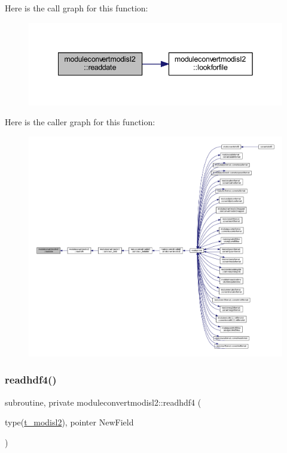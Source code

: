 Here is the call graph for this function\+:\nopagebreak
\begin{figure}[H]
\begin{center}
\leavevmode
\includegraphics[width=342pt]{namespacemoduleconvertmodisl2_a0d7d930d189037284103c8340c2d3cf6_cgraph}
\end{center}
\end{figure}
Here is the caller graph for this function\+:\nopagebreak
\begin{figure}[H]
\begin{center}
\leavevmode
\includegraphics[width=350pt]{namespacemoduleconvertmodisl2_a0d7d930d189037284103c8340c2d3cf6_icgraph}
\end{center}
\end{figure}
\mbox{\label{namespacemoduleconvertmodisl2_a816da8e71fe8787069f3e7359fc8445f}} 
\subsubsection{\texorpdfstring{readhdf4()}{readhdf4()}}
{\footnotesize\ttfamily subroutine, private moduleconvertmodisl2\+::readhdf4 (\begin{DoxyParamCaption}\item[{type(\mbox{\hyperlink{structmoduleconvertmodisl2_1_1t__modisl2}{t\+\_\+modisl2}}), pointer}]{New\+Field }\end{DoxyParamCaption})\hspace{0.3cm}{\ttfamily [private]}}


